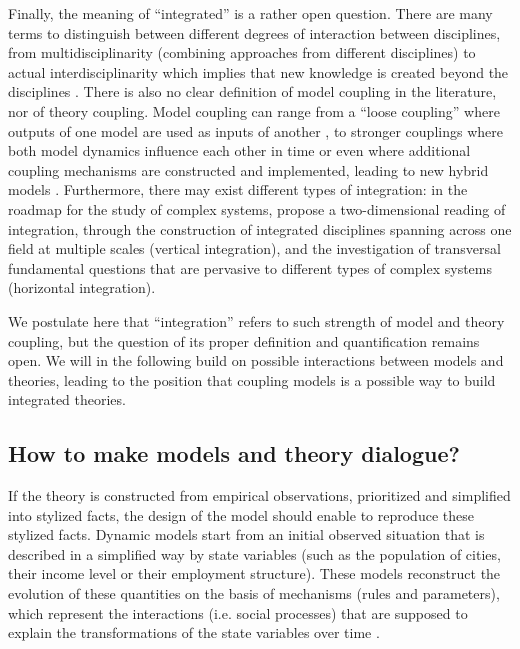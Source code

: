 \documentclass[10pt,letterpaper]{article}
\begin{document}
Finally, the meaning of ``integrated'' is a rather open question. There are many terms to distinguish between different degrees of interaction between disciplines, from multidisciplinarity (combining approaches from different disciplines) to actual interdisciplinarity which implies that new knowledge is created beyond the disciplines \citep{huutoniemi2010analyzing}. There is also no clear definition of model coupling in the literature, nor of theory coupling. Model coupling can range from a ``loose coupling'' where outputs of one model are used as inputs of another \citep{clarke1998loose}, to stronger couplings where both model dynamics influence each other in time or even where additional coupling mechanisms are constructed and implemented, leading to new hybrid models \citep{mustafa2017coupling}. Furthermore, there may exist different types of integration: in the roadmap for the study of complex systems, \citep{chavalarias2009french} propose a two-dimensional reading of integration, through the construction of integrated disciplines spanning across one field at multiple scales (vertical integration), and the investigation of transversal fundamental questions that are pervasive to different types of complex systems (horizontal integration).

We postulate here that ``integration'' refers to such strength of model and theory coupling, but the question of its proper definition and quantification remains open. We will in the following build on possible interactions between models and theories, leading to the position that coupling models is a possible way to build integrated theories.

\subsection{How to make models and theory dialogue?}

If the theory is constructed from empirical observations, prioritized and simplified into stylized facts, the design of the model should enable to reproduce these stylized facts. Dynamic models start from an initial observed situation that is described in a simplified way by state variables (such as the population of cities, their income level or their employment structure). These models reconstruct the evolution of these quantities on the basis of mechanisms (rules and parameters), which represent the interactions (i.e. social processes) that are supposed to explain the transformations of the state variables over time \citep{pumain2013theoretical}.
\end{document}
